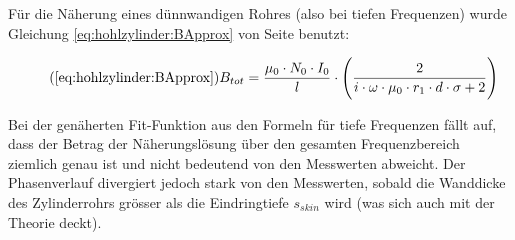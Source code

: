{\begin{minipage}[t]{0.33\textwidth}
\begin{minipage}[t]{0.5\textwidth}
        \end{minipage}
	\end{minipage}%
	\begin{minipage}[t]{0.67\textwidth}
        \vspace{0pt}\raggedright
        \hfill
        \resizebox{.95\textwidth}{!}{}
        \label{fig:cu:freq:exact}
	\end{minipage}


	\begin{minipage}[t]{0.33\textwidth}
        \vspace{0pt}

        F\"ur  die N\"aherung  eines  d\"unnwandigen Rohres  (also bei  tiefen
        Frequenzen)  wurde Gleichung  \ref{eq:hohlzylinder:BApprox} von  Seite
        \pageref{eq:hohlzylinder:BApprox} benutzt:

        \begin{equation}
            \tag{\ref{eq:hohlzylinder:BApprox}}
            B_{tot} = \frac{\mu_0 \cdot N_0 \cdot I_0}{l} \cdot \Biggl( \frac{2}{i \cdot \omega \cdot \mu_0 \cdot r_1 \cdot d \cdot \sigma + 2} \Biggr)
        \end{equation}

        Bei  der  gen\"aherten  Fit-Funktion   aus  den  Formeln  f\"ur  tiefe
        Frequenzen f\"allt auf, dass der Betrag der N\"aherungsl\"osung \"uber
        den gesamten  Frequenzbereich ziemlich  genau ist und  nicht bedeutend
        von  den Messwerten  abweicht.   Der  Phasenverlauf divergiert  jedoch
        stark  von  den Messwerten,  sobald  die  Wanddicke des  Zylinderrohrs
        gr\"osser als die Eindringtiefe $s_{skin}$ wird (was sich auch mit der
        Theorie deckt).


\end{minipage}}
